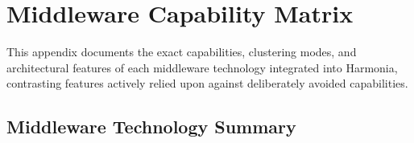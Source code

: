 
\chapter{Middleware Capability Matrix}
\label{app:middleware_matrix}

This appendix documents the exact capabilities, clustering modes, and architectural features of each middleware technology integrated into Harmonia, contrasting features actively relied upon against deliberately avoided capabilities.

\section{Middleware Technology Summary}

